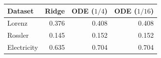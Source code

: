 \begin{tabular}{lrrr}
\toprule
Dataset & Ridge & ODE ($1/4$) & ODE ($1/16$) \\
\midrule
Lorenz & 0.376 & 0.408 & 0.408 \\
Rossler & 0.145 & 0.152 & 0.152 \\
Electricity & 0.635 & 0.704 & 0.704 \\
\bottomrule
\end{tabular}
